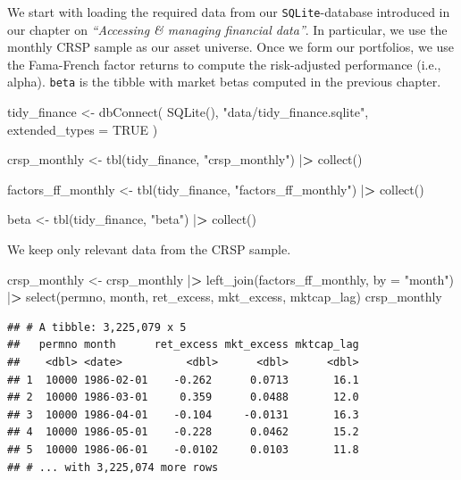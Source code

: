 \documentclass[
]{book}
\newenvironment{Shaded}{\begin{snugshade}}{\end{snugshade}}
\newcommand{\AttributeTok}[1]{\textcolor[rgb]{0.61,0.61,0.61}{#1}}
\newcommand{\ConstantTok}[1]{\textcolor[rgb]{0,0,0}{#1}}
\newcommand{\ErrorTok}[1]{\textcolor[rgb]{0.14,0.14,0.14}{\textbf{#1}}}
\newcommand{\FunctionTok}[1]{\textcolor[rgb]{0,0,0}{#1}}
\newcommand{\NormalTok}[1]{#1}
\newcommand{\OtherTok}[1]{\textcolor[rgb]{0.37,0.37,0.37}{#1}}
\newcommand{\SpecialCharTok}[1]{\textcolor[rgb]{0,0,0}{#1}}
\newcommand{\StringTok}[1]{\textcolor[rgb]{0.5,0.5,0.5}{#1}}
\begin{document}
We start with loading the required data from our \texttt{SQLite}-database introduced in our chapter on \emph{``Accessing \& managing financial data''}. In particular, we use the monthly CRSP sample as our asset universe.
Once we form our portfolios, we use the Fama-French factor returns to compute the risk-adjusted performance (i.e., alpha).
\texttt{beta} is the tibble with market betas computed in the previous chapter.

\begin{Shaded}
\begin{Highlighting}[]
\NormalTok{tidy\_finance }\OtherTok{\textless{}{-}} \FunctionTok{dbConnect}\NormalTok{(}
  \FunctionTok{SQLite}\NormalTok{(), }\StringTok{"data/tidy\_finance.sqlite"}\NormalTok{, }\AttributeTok{extended\_types =} \ConstantTok{TRUE}
\NormalTok{)}

\NormalTok{crsp\_monthly }\OtherTok{\textless{}{-}} \FunctionTok{tbl}\NormalTok{(tidy\_finance, }\StringTok{"crsp\_monthly"}\NormalTok{) }\SpecialCharTok{|}\ErrorTok{\textgreater{}}
  \FunctionTok{collect}\NormalTok{()}

\NormalTok{factors\_ff\_monthly }\OtherTok{\textless{}{-}} \FunctionTok{tbl}\NormalTok{(tidy\_finance, }\StringTok{"factors\_ff\_monthly"}\NormalTok{) }\SpecialCharTok{|}\ErrorTok{\textgreater{}}
  \FunctionTok{collect}\NormalTok{()}

\NormalTok{beta }\OtherTok{\textless{}{-}} \FunctionTok{tbl}\NormalTok{(tidy\_finance, }\StringTok{"beta"}\NormalTok{) }\SpecialCharTok{|}\ErrorTok{\textgreater{}}
  \FunctionTok{collect}\NormalTok{()}
\end{Highlighting}
\end{Shaded}

We keep only relevant data from the CRSP sample.

\begin{Shaded}
\begin{Highlighting}[]
\NormalTok{crsp\_monthly }\OtherTok{\textless{}{-}}\NormalTok{ crsp\_monthly }\SpecialCharTok{|}\ErrorTok{\textgreater{}}
  \FunctionTok{left\_join}\NormalTok{(factors\_ff\_monthly, }\AttributeTok{by =} \StringTok{"month"}\NormalTok{) }\SpecialCharTok{|}\ErrorTok{\textgreater{}}
  \FunctionTok{select}\NormalTok{(permno, month, ret\_excess, mkt\_excess, mktcap\_lag)}
\NormalTok{crsp\_monthly}
\end{Highlighting}
\end{Shaded}

\begin{verbatim}
## # A tibble: 3,225,079 x 5
##   permno month      ret_excess mkt_excess mktcap_lag
##    <dbl> <date>          <dbl>      <dbl>      <dbl>
## 1  10000 1986-02-01    -0.262      0.0713       16.1
## 2  10000 1986-03-01     0.359      0.0488       12.0
## 3  10000 1986-04-01    -0.104     -0.0131       16.3
## 4  10000 1986-05-01    -0.228      0.0462       15.2
## 5  10000 1986-06-01    -0.0102     0.0103       11.8
## # ... with 3,225,074 more rows
\end{verbatim}
\end{document}
